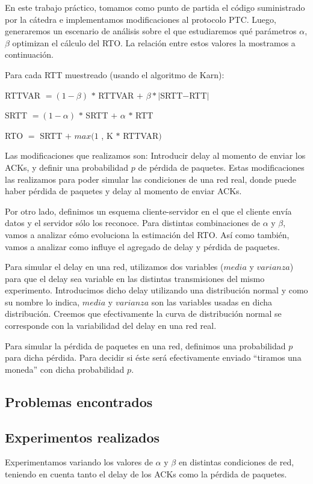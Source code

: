 En este trabajo práctico, tomamos como punto de partida el código suministrado por la cátedra e implementamos modificaciones al protocolo PTC. Luego, generaremos un escenario de análisis sobre el que estudiaremos qué parámetros $\alpha$, $\beta$ optimizan el cálculo del RTO. La relación entre estos valores la mostramos a continuación.

Para cada RTT muestreado (usando el algoritmo de Karn):

\indent \indent RTTVAR $= (1-\beta)$ $*$ RTTVAR $ +$ $\beta * |$SRTT$-$RTT$|$

\indent \indent SRTT $= (1-\alpha)$ $*$ SRTT $+$ $\alpha$ $*$ RTT

\indent \indent RTO $=$ SRTT $+$ $max (1$ , K $*$ RTTVAR$)$

Las modificaciones que realizamos son: Introducir delay al momento de enviar los ACKs, y definir una probabilidad $p$ de pérdida de paquetes. Estas modificaciones las realizamos para poder simular las condiciones de una red real, donde puede haber pérdida de paquetes y delay al momento de enviar ACKs.

Por otro lado, definimos un esquema cliente-servidor en el que el cliente envía datos y el servidor sólo los reconoce. Para distintas combinaciones de $\alpha$ y $\beta$, vamos a analizar cómo evoluciona la estimación del RTO. Así como también, vamos a analizar como influye el agregado de delay y pérdida de paquetes.

Para simular el delay en una red, utilizamos dos variables ($media$ y $varianza$) para que el delay sea variable en las distintas transmisiones del mismo experimento. Introducimos dicho delay utilizando una distribución normal y como su nombre lo indica, $media$ y $varianza$ son las variables usadas en dicha distribución. Creemos que efectivamente la curva de distribución normal se corresponde con la variabilidad del delay en una red real.

Para simular la pérdida de paquetes en una red, definimos una probabilidad $p$ para dicha pérdida. Para decidir si éste será efectivamente enviado “tiramos una moneda” con dicha probabilidad $p$.

\subsection{Problemas encontrados}

\subsection{Experimentos realizados}
Experimentamos variando los valores de $\alpha$ y $\beta$ en distintas condiciones de red, teniendo en cuenta tanto el delay de los ACKs como la pérdida de paquetes.

